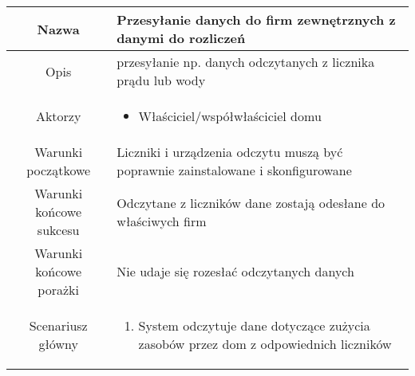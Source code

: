 \documentclass{article}
\begin{document}
\begin{enumerate}
\begin{enumerate}
				\begin{table}[H]
					\centering
					\begin{tabular}{|c|p{7cm}|}
						\hline
						Nazwa                   & \textbf{Przesyłanie danych do firm zewnętrznych z danymi do rozliczeń}                                                                                                                                                                                                                                                    \\
						\hline
						Opis                    & przesyłanie np. danych odczytanych z licznika prądu lub wody                                                                                                                                                                                                                                                              \\
						\hline
						Aktorzy                 & \begin{itemize}\item Właściciel/współwłaściciel domu\end{itemize}                                                                                                                                                                                                                                                         \\
						\hline
						Warunki początkowe      & Liczniki i urządzenia odczytu muszą być poprawnie zainstalowane i skonfigurowane                                                                                                                                                                                                                                          \\
						\hline
						Warunki końcowe sukcesu & Odczytane z liczników dane zostają odesłane do właściwych firm                                                                                                                                                                                                                                                            \\
						\hline
						Warunki końcowe porażki & Nie udaje się rozesłać odczytanych danych                                                                                                                                                                                                                                                                                 \\
						\hline
						Scenariusz główny       & \begin{enumerate}\item System odczytuje dane dotyczące zużycia zasobów przez dom z odpowiednich liczników


\end{enumerate}
\end{tabular}
\end{table}
\end{enumerate}
\end{enumerate}
\end{document}
